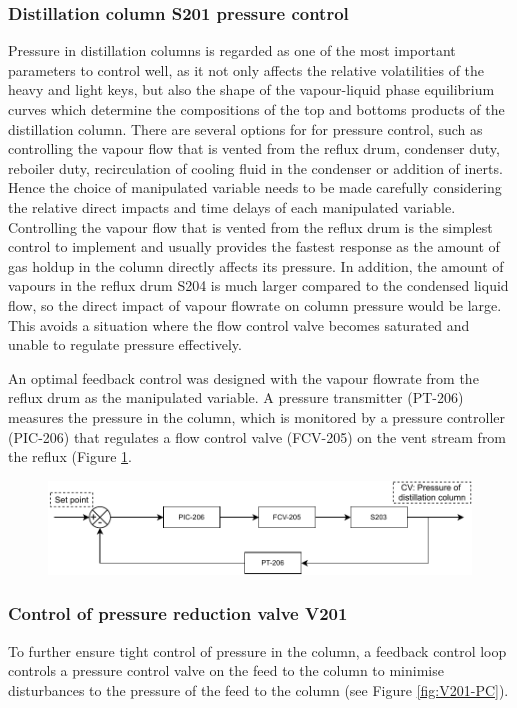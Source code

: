 \subsubsection{Distillation column S201 pressure control}
Pressure in distillation columns is regarded as one of the most important parameters to control well, as it not only affects the relative volatilities of the heavy and light keys, but also the shape of the vapour-liquid phase equilibrium curves which determine the compositions of the top and bottoms products of the distillation column. There are several options for for pressure control, such as controlling the vapour flow that is vented from the reflux drum, condenser duty, reboiler duty, recirculation of cooling fluid in the condenser or addition of inerts. Hence the choice of manipulated variable needs to be made carefully considering the relative direct impacts and time delays of each manipulated variable. Controlling the vapour flow that is vented from the reflux drum is the simplest control to implement and usually provides the fastest response as the amount of gas holdup in the column directly affects its pressure. In addition, the amount of vapours in the reflux drum S204 is much larger compared to the condensed liquid flow, so the direct impact of vapour flowrate on column pressure would be large. This avoids a situation where the flow control valve becomes saturated and unable to regulate pressure effectively. 

An optimal feedback control was designed with the vapour flowrate from the reflux drum as the manipulated variable. A pressure transmitter (PT-206) measures the pressure in the column, which is monitored by a pressure controller (PIC-206) that regulates a flow control valve (FCV-205) on the vent stream from the reflux (Figure \ref{fig:S203-PC}.

\begin{figure}[H]
    \centering
    \includegraphics[width=\linewidth]{chapters/4-operation-control/4-Figures/S203-PC.pdf}
    \caption{}
    \label{fig:S203-PC}
\end{figure}


\subsubsection{Control of pressure reduction valve V201}
To further ensure tight control of pressure in the column, a feedback control loop controls a pressure control valve on the feed to the column to minimise disturbances to the pressure of the feed to the column (see Figure \ref{fig:V201-PC}).

